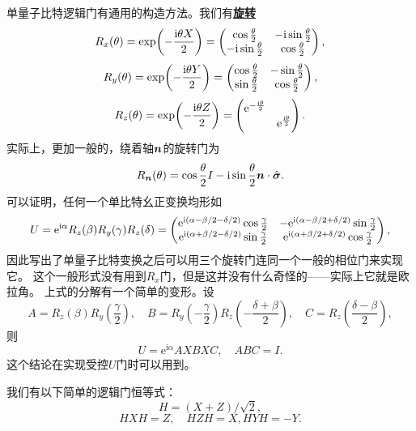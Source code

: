 \documentclass[hyperref, UTF8, a4paper]{ctexart}
\newcommand*{\ii}{\mathrm{i}}
\newcommand*{\ee}{\mathrm{e}}
\newcommand*{\concept}[1]{\underline{\textbf{#1}}}
\begin{document}
单量子比特逻辑门有通用的构造方法。我们有\concept{旋转}
\begin{equation}
    R_x(\theta) = \exp(-\frac{\ii \theta X}{2}) = \pmqty{ \cos \frac{\theta}{2} & - \ii \sin \frac{\theta}{2} \\ - \ii \sin \frac{\theta}{2} & \cos \frac{\theta}{2} },
\end{equation}
\begin{equation}
    R_y(\theta) = \exp(-\frac{\ii \theta Y}{2}) = \pmqty{ \cos \frac{\theta}{2} & - \sin \frac{\theta}{2} \\ \sin \frac{\theta}{2} & \cos \frac{\theta}{2} },
\end{equation}
\begin{equation}
    R_z(\theta) = \exp(-\frac{\ii \theta Z}{2}) = \pmqty{\dmat{\ee^{- \frac{\ii \theta}{2}}, \ee^{\frac{\ii \theta}{2}}}}.
\end{equation}
实际上，更加一般的，绕着轴$\vb*{n}$的旋转门为
\begin{equation}
    R_{\vb*{n}}(\theta) = \cos \frac{\theta}{2} I - \ii \sin \frac{\theta}{2} \vb*{n} \cdot \hat{\vb*{\sigma}}.
\end{equation}
可以证明，任何一个单比特幺正变换均形如
\begin{equation}
    U = \ee^{\ii \alpha} R_z(\beta) R_y(\gamma) R_z(\delta) = \pmqty{ \ee^{\ii (\alpha - \beta/2 - \delta / 2)} \cos \frac{\gamma}{2} & - \ee^{\ii (\alpha - \beta/2 + \delta / 2)} \sin \frac{\gamma}{2} \\ \ee^{\ii (\alpha + \beta/2 - \delta / 2)} \sin \frac{\gamma}{2} & \ee^{\ii (\alpha + \beta/2 + \delta / 2)} \cos \frac{\gamma}{2} },
\end{equation}
因此写出了单量子比特变换之后可以用三个旋转门连同一个一般的相位门来实现它。
这个一般形式没有用到$R_x$门，但是这并没有什么奇怪的——实际上它就是欧拉角。
上式的分解有一个简单的变形。设
\begin{equation}
    A = R_z(\beta) R_y \left( \frac{\gamma}{2} \right), \quad B = R_y\left( - \frac{\gamma}{2} \right) R_z\left( - \frac{\delta + \beta}{2} \right), \quad C = R_z\left( \frac{\delta - \beta}{2} \right),
    \label{eq:abc-decomposition}
\end{equation}
则
\begin{equation}
    U = \ee^{\ii \alpha} A X B X C, \quad ABC = I.
\end{equation}
这个结论在实现受控$U$门时可以用到。

我们有以下简单的逻辑门恒等式：
\begin{equation}
    H = (X + Z) / \sqrt{2},
\end{equation}
\begin{equation}
    H X H = Z, \quad H Z H = X, H Y H = - Y.
\end{equation}
\end{document}
